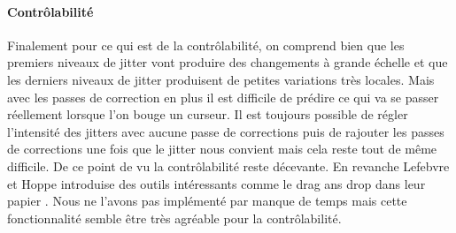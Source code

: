 \documentclass[12pt]{article}
\begin{document}
\paragraph{Contrôlabilité}
Finalement pour ce qui est de la contrôlabilité, on comprend bien que les premiers niveaux de jitter vont produire des changements à grande échelle et que les derniers niveaux de jitter produisent de petites variations très locales. Mais avec les passes de correction en plus il est difficile de prédire ce qui va se passer réellement lorsque l'on bouge un curseur. Il est toujours possible de régler l'intensité des jitters avec aucune passe de corrections puis de rajouter les passes de corrections une fois que le jitter nous convient mais cela reste tout de même difficile. De ce point de vu la contrôlabilité reste décevante. En revanche Lefebvre et Hoppe introduise des outils intéressants comme le drag ans drop dans leur papier \cite{Lef++}. Nous ne l'avons pas implémenté par manque de temps mais cette fonctionnalité semble être très agréable pour la contrôlabilité.
\end{document}
